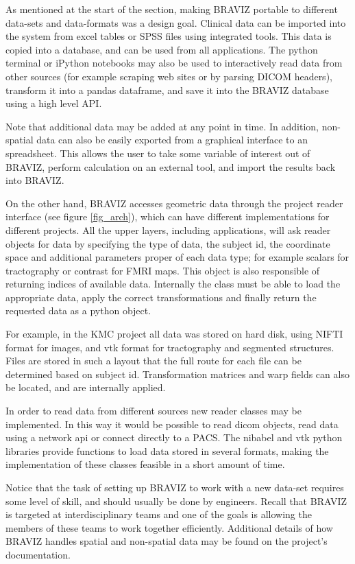 \documentclass[twocolumn]{svjour3}
\begin{document}

As mentioned at the start of the section, making BRAVIZ portable to different data-sets and data-formats was a design goal. Clinical data can be imported into the system from excel tables or SPSS files using integrated tools. This data is copied into a database, and can be used from all applications. The python terminal or iPython notebooks \cite{} may also be used to interactively read data from other sources (for example scraping web sites or by parsing DICOM headers), transform it into a pandas dataframe, and save it into the BRAVIZ database using a high level API.

Note that additional data may be added at any point in time. In addition, non-spatial data can also be easily exported from a graphical interface to an spreadsheet. This allows the user to take some variable of interest out of BRAVIZ, perform calculation on an external tool, and import the results back into BRAVIZ.

On the other hand, BRAVIZ accesses geometric data through the project reader interface (see figure \ref{fig_arch}), which can have different implementations for different projects. All the upper layers, including applications, will ask reader objects for data by specifying the type of data, the subject id, the coordinate space  and additional parameters proper of each data type; for example scalars for tractography or contrast for FMRI maps. This object is also responsible of returning indices of available data. Internally the class must be able to load the appropriate data, apply the correct transformations and finally return the requested data as a python object. 

For example, in the KMC project all data was stored on hard disk, using NIFTI format for images, and vtk format for tractography and segmented structures. Files are stored in such a layout that the full route for each file can be determined based on subject id. Transformation matrices and warp fields can also be located, and are internally applied.

In order to read data from different sources new reader classes may be implemented. In this way it would be possible to read dicom objects, read data using a network api or connect directly to a PACS. The nibabel and vtk python libraries provide functions to load data stored in several formats, making the implementation of these classes feasible in a short amount of time.

Notice that the task of setting up BRAVIZ to work with a new data-set requires some level of skill, and should usually be done by engineers. Recall that BRAVIZ is targeted at interdisciplinary teams and one of the goals is allowing the members of these teams to work together efficiently. Additional details of how BRAVIZ handles spatial and non-spatial data may be found on the project's documentation. 
\end{document}
